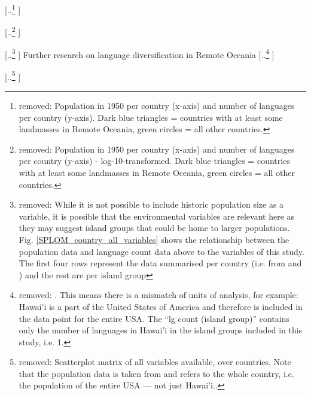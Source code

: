 \documentclass[unnumsec,webpdf,modern,medium]{oup-authoring-template}
\providecommand{\DIFaddtex}[1]{{\protect\color{blue} \sf #1}} %
\providecommand{\DIFdeltex}[1]{{\protect\color{red} [..\footnote{removed: #1} ]}} %
\providecommand{\DIFaddbegin}{} %
\providecommand{\DIFaddend}{} %
\providecommand{\DIFdelbegin}{} %
\providecommand{\DIFdelend}{} %
\providecommand{\DIFdelFL}[1]{\DIFdel{#1}} %
\providecommand{\DIFadd}[1]{\texorpdfstring{\DIFaddtex{#1}}{#1}} %
\providecommand{\DIFdel}[1]{\texorpdfstring{\DIFdeltex{#1}}{}} %
\newcommand{\DIFscaledelfig}{0.5}
\newlength{\DIFdelgraphicswidth} %
\newlength{\DIFdelgraphicsheight} %
\newcommand{\DIFaddincludegraphics}[2][]{{\color{blue}\fbox{\DIFOincludegraphics[#1]{#2}}}} %
\newcommand{\DIFdelincludegraphics}[2][]{%
\sbox{\DIFdelgraphicsbox}{\DIFOincludegraphics[#1]{#2}}%
\settoboxwidth{\DIFdelgraphicswidth}{\DIFdelgraphicsbox} %
\settoboxtotalheight{\DIFdelgraphicsheight}{\DIFdelgraphicsbox} %
\scalebox{\DIFscaledelfig}{%
\parbox[b]{\DIFdelgraphicswidth}{\usebox{\DIFdelgraphicsbox}\\[-\baselineskip] \rule{\DIFdelgraphicswidth}{0em}}\llap{\resizebox{\DIFdelgraphicswidth}{\DIFdelgraphicsheight}{%
\setlength{\unitlength}{\DIFdelgraphicswidth}%
\begin{picture}(1,1)%
\thicklines\linethickness{2pt} %
{\color[rgb]{1,0,0}\put(0,0){\framebox(1,1){}}}%
{\color[rgb]{1,0,0}\put(0,0){\line( 1,1){1}}}%
{\color[rgb]{1,0,0}\put(0,1){\line(1,-1){1}}}%
\end{picture}%
}\hspace*{3pt}}} %
} %
\DeclareRobustCommand{\DIFaddbegin}{\DIFOaddbegin \let\includegraphics\DIFaddincludegraphics} %
\DeclareRobustCommand{\DIFaddend}{\DIFOaddend \let\includegraphics\DIFOincludegraphics} %
\DeclareRobustCommand{\DIFdelbegin}{\DIFOdelbegin \let\includegraphics\DIFdelincludegraphics} %
\DeclareRobustCommand{\DIFdelend}{\DIFOaddend \let\includegraphics\DIFOincludegraphics} %
\begin{document}
{%
\DIFdelFL{Population in 1950 per country (x-axis) and number of languages per country (y-axis). Dark blue triangles = countries with at least some landmasses in Remote Oceania, green circles = all other countries.}}

{%
\DIFdelFL{Population in 1950 per country (x-axis) and number of languages per country (y-axis) - log-10-transformed. Dark blue triangles = countries with at least some landmasses in Remote Oceania, green circles = all other countries.}}

\DIFdel{While it is not possible to include historic population size as a variable, it is possible that the environmental variables are relevant here as they may suggest island groups that could be home to larger populations. Fig. \ref{SPLOM_country_all_variables} shows the relationship between the population data and language count data above to the variables of this study. The first four rows represent the data summarised per country (i.e. from  \citet{UN_pop} and \citet{glottolog3}) and the rest are per island group }\DIFdelend \DIFaddbegin \DIFadd{Further research on language diversification }\DIFaddend in Remote Oceania \DIFdelbegin \DIFdel{. This means there is a mismatch of units of analysis, for example: Hawai'i is a part of the United States of America and therefore is included in the data point for the entire USA. The ``lg count (island group)'' contains only the number of languages in Hawai'i in the island groups included in this study, i.e. 1.
}%

{%
\DIFdelFL{Scatterplot matrix of all variables available, over countries. Note that the population data is taken from \citet{UN_pop} and refers to the whole country, i.e. the population of the entire USA --- not just Hawai'i..}}
\end{document}
